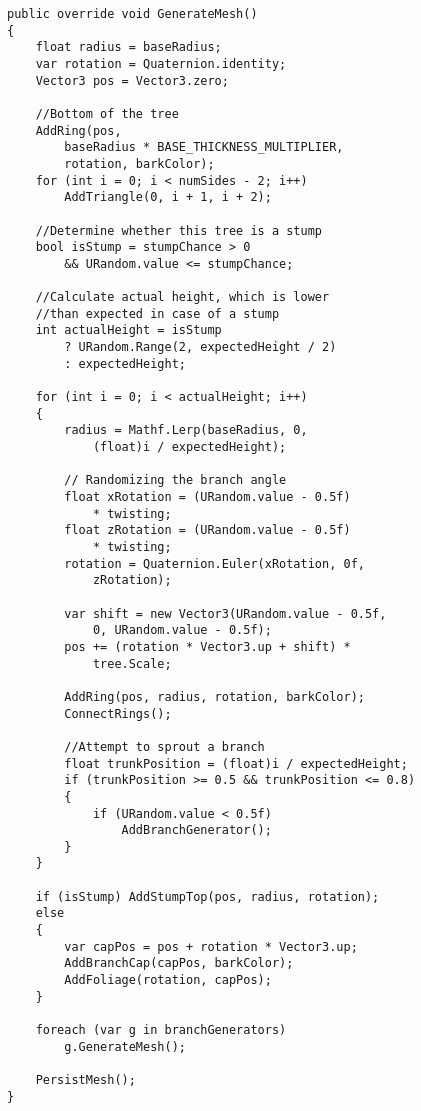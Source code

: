 \begin{lstlisting}
public override void GenerateMesh()
{
    float radius = baseRadius;
    var rotation = Quaternion.identity;
    Vector3 pos = Vector3.zero;

    //Bottom of the tree
    AddRing(pos, 
        baseRadius * BASE_THICKNESS_MULTIPLIER, 
        rotation, barkColor);
    for (int i = 0; i < numSides - 2; i++) 
        AddTriangle(0, i + 1, i + 2);

    //Determine whether this tree is a stump
    bool isStump = stumpChance > 0 
        && URandom.value <= stumpChance;

    //Calculate actual height, which is lower 
    //than expected in case of a stump
    int actualHeight = isStump 
        ? URandom.Range(2, expectedHeight / 2) 
        : expectedHeight;

    for (int i = 0; i < actualHeight; i++)
    {
        radius = Mathf.Lerp(baseRadius, 0, 
            (float)i / expectedHeight);

        // Randomizing the branch angle
        float xRotation = (URandom.value - 0.5f) 
            * twisting;
        float zRotation = (URandom.value - 0.5f) 
            * twisting;
        rotation = Quaternion.Euler(xRotation, 0f, 
            zRotation);

        var shift = new Vector3(URandom.value - 0.5f, 
            0, URandom.value - 0.5f);
        pos += (rotation * Vector3.up + shift) * 
            tree.Scale;

        AddRing(pos, radius, rotation, barkColor);
        ConnectRings();

        //Attempt to sprout a branch
        float trunkPosition = (float)i / expectedHeight;
        if (trunkPosition >= 0.5 && trunkPosition <= 0.8)
        {
            if (URandom.value < 0.5f) 
                AddBranchGenerator();
        }
    }

    if (isStump) AddStumpTop(pos, radius, rotation);
    else
    {
        var capPos = pos + rotation * Vector3.up;
        AddBranchCap(capPos, barkColor);
        AddFoliage(rotation, capPos);
    }

    foreach (var g in branchGenerators) 
        g.GenerateMesh();

    PersistMesh();
}
\end{lstlisting}

